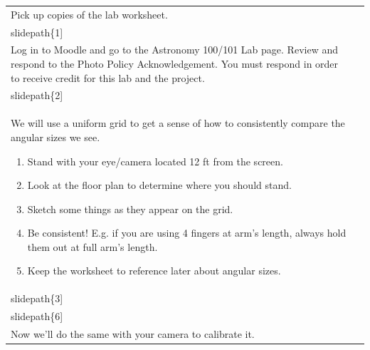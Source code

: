 \documentclass[12pt]{article}
\begin{document}
\begin{longtable}{|m{}|m{}|}\hline
Pick up copies of the lab worksheet. & \texttt{[image: \\slidepath\{1]}}\\\hline
Log in to Moodle and go to the Astronomy 100/101 Lab page. Review and respond to the Photo Policy Acknowledgement. You must respond in order to receive credit for this lab and the project.& \texttt{[image: \\slidepath\{2]}}\\\hline
We will use a uniform grid to get a sense of how to consistently compare the angular sizes we see. 

\begin{enumerate}
\item Stand with your eye/camera located 12 ft from the screen. 
\item Look at the floor plan to determine where you should stand. 
\item Sketch some things as they appear on the grid. 
\item Be consistent! E.g. if you are using 4 fingers at arm's length, always hold them out at full arm's length. 
\item Keep the worksheet to reference later about angular sizes.
\end{enumerate} & \texttt{[image: \\slidepath\{3]}}

\texttt{[image: \\slidepath\{6]}}\\\hline
Now we'll do the same with your camera to calibrate it.


\end{longtable}
\end{document}
